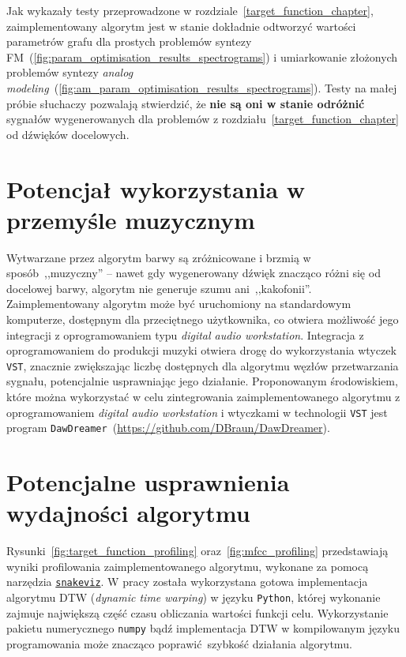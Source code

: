 Jak wykazały testy przeprowadzone w rozdziale~\ref{target_function_chapter},
zaimplementowany algorytm jest w stanie dokładnie odtworzyć wartości
parametrów grafu dla prostych problemów syntezy
FM~(\ref{fig:param_optimisation_results_spectrograms})
i umiarkowanie złożonych problemów syntezy
\textit{analog modeling}~(\ref{fig:am_param_optimisation_results_spectrograms}).
Testy na małej próbie słuchaczy pozwalają stwierdzić,
że \textbf{nie są oni w stanie odróżnić} sygnałów wygenerowanych
dla problemów z rozdziału~\ref{target_function_chapter}
od dźwięków docelowych.



\section{Potencjał wykorzystania w przemyśle muzycznym}\label{sec:music_industry_usage}

Wytwarzane przez algorytm barwy są zróżnicowane i brzmią
w sposób~,,muzyczny'' -- nawet gdy wygenerowany dźwięk
znacząco różni się od docelowej barwy, algorytm nie generuje
szumu ani~,,kakofonii''. 
Zaimplementowany algorytm może być uruchomiony na standardowym komputerze,
dostępnym dla przeciętnego użytkownika, co otwiera możliwość jego integracji
z oprogramowaniem typu \textit{digital audio workstation}. Integracja
z oprogramowaniem do produkcji muzyki otwiera drogę do wykorzystania
wtyczek \texttt{VST}, znacznie zwiększając liczbę dostępnych
dla algorytmu węzłów przetwarzania sygnału, potencjalnie usprawniając
jego działanie. Proponowanym środowiskiem, które można wykorzystać w celu zintegrowania
zaimplementowanego algorytmu z oprogramowaniem \textit{digital audio workstation}
i wtyczkami w technologii \texttt{VST} jest program
\texttt{DawDreamer}~(\url{https://github.com/DBraun/DawDreamer}).


\section{Potencjalne usprawnienia wydajności algorytmu}

Rysunki~\ref{fig:target_function_profiling} oraz~\ref{fig:mfcc_profiling}
przedstawiają wyniki profilowania zaimplementowanego algorytmu, wykonane
za pomocą narzędzia \href{https://jiffyclub.github.io/snakeviz/}{\texttt{snakeviz}}.
W pracy została wykorzystana gotowa implementacja
algorytmu DTW (\textit{dynamic time warping}) w języku \texttt{Python}, której
wykonanie zajmuje największą część czasu obliczania wartości funkcji celu.
Wykorzystanie pakietu numerycznego \texttt{numpy} bądź implementacja DTW w
kompilowanym języku programowania może znacząco poprawić szybkość działania algorytmu.


